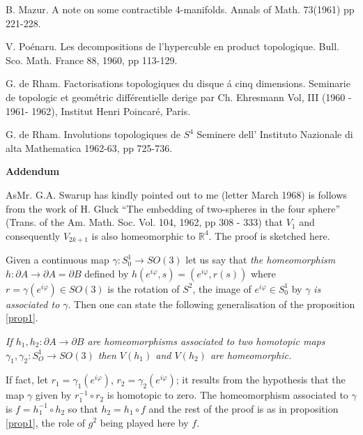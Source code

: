 \begin{thebibliography}{99}
 B. Mazur. A note on some contractible 4-manifolds. Annals of
Math. 73(1961) pp 221-228.  

 V. Po\'enaru. Les decompositions de l'hypercuble en product
topologique. Bull. Sco. Math. France 88, 1960, pp 113-129. 

 G. de Rham. Factorisations topologiques du disque \'a cinq
dimensions. Seminarie de topologic et geom\'etric diff\'erentielle derige
par Ch. Ehresmann Vol, III (1960 - 1961- 1962), Institut Henri
Poincar\'e, Paris. 

 G. de Rham. Involutions topologiques de $S^4$ Seminere dell' Instituto
Nazionale di alta Mathematica 1962-63, pp 725-736. 
\end{thebibliography}

\newpage

\begin{center}
\textbf{\Large{Addendum}}
\end{center}

As\pageoriginale Mr. G.A. Swarup has kindly pointed out to me (letter
March 1968) is follows from the work of H. Gluck ``The embedding of
two-spheres in the four sphere'' (Trans. of the
Am. Math. Soc. Vol. 104, 1962, pp 308 - 333) that $V_1$ and
consequently $V_{2k + 1}$ is also homeomorphic to $\mathbb{R}^4$. The
proof is sketched here.  

Given a continuous map $\gamma : S^1_0 \to  SO (3)$ let us say that
\textit{the homeomorphism} $h: \partial A \to \partial A = \partial
B$ defined by $h(e^{i \varphi}, s) = (e^{i \varphi}, r (s))$ where $r =
\gamma (e^{i \varphi}) \in SO (3)$ is the rotation of $S^2$, the image
of $e^{i \varphi} \in S^1_0$ by $\gamma$ \textit{is associated to
  $\gamma$}. Then one can state the following generalisation of the
proposition \ref{prop1}. 

\textit{If $h_1, h_2 : \partial A \to \partial B$ are homeomorphisms
  associated to two homotopic maps $\gamma_1, \gamma_2: S^1_O \to
  SO (3)$ then $V(h_1)$ and $V(h_2)$ are homeomorphic.}  

If fact, let $r_1 = \gamma_1 (e^{i \varphi})$, $r_2 = \gamma_2 (e^{i
  \varphi})$; it results from the hypothesis that the map $\gamma$
given by $r^{-1}_1 \circ r_2$ is homotopic to zero. The homeomorphism
associated to $\gamma$ is $f = h^{-1}_1 \circ h_2$  so that $h_2 = h_1
\circ f$ and the rest of the proof is as in proposition \ref{prop1}, the role of
$g^2$ being played here by $f$. 


